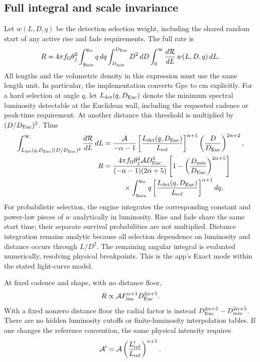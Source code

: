 \documentclass[11pt,a4paper]{article}
\begin{document}
\subsection{Full integral and scale invariance}

Let $w(L,D,q)$ be the detection selection weight, including the shared
random start of any active rise and fade requirements. The full rate is
\begin{equation}
 R=4\pi f_\Omega\theta_j^2
 \int_{q_{\rm min}}^{q_{\rm nr}}q\,dq
 \int_{D_{\rm min}}^{D_{\rm Euc}}D^2\,dD
 \int_0^\infty \frac{d\mathcal R}{dL}\,w(L,D,q)\,dL.
 \label{eq:lf_full_intensity}
\end{equation}
All lengths and the volumetric density in this expression must use the same
length unit. In particular, the implementation converts Gpc to cm explicitly.
For a hard selection at angle $q$, let $L_{\rm det}(q,D_{\rm Euc})$ denote
the minimum spectral luminosity detectable at the Euclidean wall, including
the requested cadence or peak-time requirement. At another distance this
threshold is multiplied by $(D/D_{\rm Euc})^2$. Thus
\begin{align}
 \int_{L_{\rm det}(q,D_{\rm Euc})(D/D_{\rm Euc})^2}^{\infty}
 \frac{d\mathcal R}{dL}\,dL
 &=\frac{\mathcal A}{-\alpha-1}
 \left[\frac{L_{\rm det}(q,D_{\rm Euc})}{L_{\rm ref}}\right]^{\alpha+1}
 \left(\frac{D}{D_{\rm Euc}}\right)^{2\alpha+2},\\
 R&=\frac{4\pi f_\Omega\theta_j^2\mathcal A D_{\rm Euc}^3}
 {(-\alpha-1)(2\alpha+5)}
 \left[1-\left(\frac{D_{\rm min}}{D_{\rm Euc}}\right)^{2\alpha+5}\right]
 \nonumber\\[-2pt]
 &\hspace{1cm}\times
 \int_{q_{\rm min}}^{q_{\rm nr}}q
 \left[\frac{L_{\rm det}(q,D_{\rm Euc})}{L_{\rm ref}}\right]^{\alpha+1}dq.
 \label{eq:lf_closed_radial}
\end{align}
For probabilistic selection, the engine integrates the corresponding
constant and power-law pieces of $w$ analytically in luminosity. Rise and
fade share the same start time; their separate survival probabilities are
not multiplied. Distance integration remains analytic because all selection
dependence on luminosity and distance occurs through $L/D^2$.
The remaining angular integral is evaluated numerically, resolving physical
breakpoints. This is the app's Exact mode within the stated light-curve model.

At fixed cadence and shape, with no distance floor,
\begin{equation}
 R\propto\mathcal A F_{\rm lim}^{\alpha+1}D_{\rm Euc}^{2\alpha+5}.
\end{equation}
With a fixed nonzero distance floor the radial factor is instead
$D_{\rm Euc}^{2\alpha+5}-D_{\rm min}^{2\alpha+5}$.
There are no hidden luminosity cutoffs or finite-luminosity interpolation tables.
If one changes the reference convention, the same physical intensity requires
\[
 \mathcal A'=\mathcal A
 \left(\frac{L_{\rm ref}'}{L_{\rm ref}}\right)^{\alpha+1}.
\]
\end{document}
